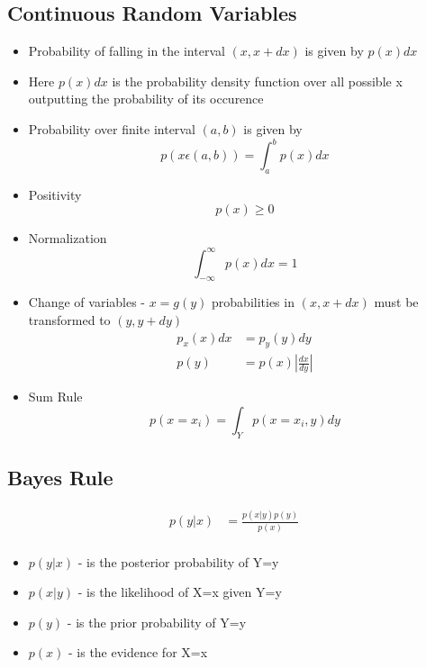 \documentclass{article}
\begin{document}
\subsection{Continuous Random Variables}
\begin{itemize}
    \item Probability of falling in the interval $(x, x+dx)$ is given
          by $p(x)dx$
    \item Here $p(x)dx$ is the probability density function over all possible x outputting the probability of its occurence
    \item Probability over finite interval $(a,b)$ is given by
          \begin{equation*}
              p(x \epsilon (a,b) ) = \int_{a}^{b}p(x)dx
          \end{equation*}
    \item Positivity
          \begin{equation*}
              p(x) \geq 0
          \end{equation*}
    \item Normalization
          \begin{equation*}
              \int_{-\infty}^{\infty}p(x)dx = 1
          \end{equation*}
    \item Change of variables - $x = g(y)$ probabilities in $(x,x+dx)$ must be transformed to $(y, y+dy)$
          \begin{align*}
              p_x(x)dx & = p_y(y)dy               \\
              p(y)     & = p(x) | \frac{dx}{dy} |
          \end{align*}
    \item Sum Rule
          \begin{equation*}
              p(x = x_i) = \int_{Y}^{} p(x=x_i,y)dy
          \end{equation*}
\end{itemize}

\subsection{Bayes Rule}
\begin{align*}
    p(y|x) & = \frac{p(x|y)p(y)}{p(x)} \\
\end{align*}
\begin{itemize}
    \item $p(y|x)$ - is the posterior probability of Y=y
    \item $p(x|y)$ - is the likelihood of X=x given Y=y
    \item $p(y)$ - is the prior probability of Y=y
    \item $p(x)$ - is the evidence for X=x
\end{itemize}
\end{document}
